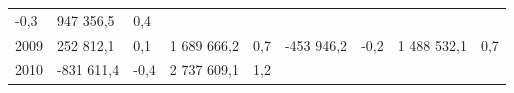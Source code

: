 \begin{longtable}[]{@{}lllllllll@{}}
\begin{minipage}[t]{0.06\columnwidth}
-0,3\strut
\end{minipage} & \begin{minipage}[t]{0.10\columnwidth}\raggedright
947 356,5\strut
\end{minipage} & \begin{minipage}[t]{0.06\columnwidth}\raggedright
0,4\strut
\end{minipage}\tabularnewline
\begin{minipage}[t]{0.05\columnwidth}\raggedright
2009\strut
\end{minipage} & \begin{minipage}[t]{0.10\columnwidth}\raggedright
252 812,1\strut
\end{minipage} & \begin{minipage}[t]{0.06\columnwidth}\raggedright
0,1\strut
\end{minipage} & \begin{minipage}[t]{0.16\columnwidth}\raggedright
1 689 666,2\strut
\end{minipage} & \begin{minipage}[t]{0.06\columnwidth}\raggedright
0,7\strut
\end{minipage} & \begin{minipage}[t]{0.12\columnwidth}\raggedright
-453 946,2\strut
\end{minipage} & \begin{minipage}[t]{0.06\columnwidth}\raggedright
-0,2\strut
\end{minipage} & \begin{minipage}[t]{0.10\columnwidth}\raggedright
1 488 532,1\strut
\end{minipage} & \begin{minipage}[t]{0.06\columnwidth}\raggedright
0,7\strut
\end{minipage}\tabularnewline
\begin{minipage}[t]{0.05\columnwidth}\raggedright
2010\strut
\end{minipage} & \begin{minipage}[t]{0.10\columnwidth}\raggedright
-831 611,4\strut
\end{minipage} & \begin{minipage}[t]{0.06\columnwidth}\raggedright
-0,4\strut
\end{minipage} & \begin{minipage}[t]{0.16\columnwidth}\raggedright
2 737 609,1\strut
\end{minipage} & \begin{minipage}[t]{0.06\columnwidth}\raggedright
1,2\strut

\end{minipage}
\end{longtable}
